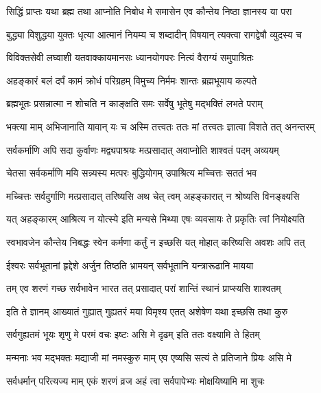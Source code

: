 \twolineshloka
{सिद्धिं प्राप्तः यथा ब्रह्म तथा आप्नोति निबोध मे}
{समासेन एव कौन्तेय निष्ठा ज्ञानस्य या परा}%

\twolineshloka
{बुद्ध्या विशुद्धया युक्तः धृत्या आत्मानं नियम्य च}
{शब्दादीन् विषयान् त्यक्त्वा रागद्वेषौ व्युदस्य च}%

\twolineshloka
{विविक्तसेवी लघ्वाशी यतवाक्कायमानसः}
{ध्यानयोगपरः नित्यं वैराग्यं समुपाश्रितः}%

\twolineshloka
{अहङ्कारं बलं दर्पं कामं क्रोधं परिग्रहम्}
{विमुच्य निर्ममः शान्तः ब्रह्मभूयाय कल्पते}%

\twolineshloka
{ब्रह्मभूतः प्रसन्नात्मा न शोचति न काङ्क्षति}
{समः सर्वेषु भूतेषु मद्भक्तिं लभते पराम्}%

\twolineshloka
{भक्त्या माम् अभिजानाति यावान् यः च अस्मि तत्त्वतः}
{ततः मां तत्त्वतः ज्ञात्वा विशते तत् अनन्तरम्}%

\twolineshloka
{सर्वकर्माणि अपि सदा कुर्वाणः मद्व्यपाश्रयः}
{मत्प्रसादात् अवाप्नोति शाश्वतं पदम् अव्ययम्}%

\twolineshloka
{चेतसा सर्वकर्माणि मयि सन्न्यस्य मत्परः}
{बुद्धियोगम् उपाश्रित्य मच्चित्तः सततं भव}%

\twolineshloka
{मच्चित्तः सर्वदुर्गाणि मत्प्रसादात् तरिष्यसि}
{अथ चेत् त्वम् अहङ्कारात् न श्रोष्यसि विनङ्क्ष्यसि}%

\twolineshloka
{यत् अहङ्कारम् आश्रित्य न योत्स्ये इति मन्यसे}
{मिथ्या एषः व्यवसायः ते प्रकृतिः त्वां नियोक्ष्यति}%

\twolineshloka
{स्वभावजेन कौन्तेय निबद्धः स्वेन कर्मणा}
{कर्तुं न इच्छसि यत् मोहात् करिष्यसि अवशः अपि तत्}%

\twolineshloka
{ईश्वरः सर्वभूतानां हृद्देशे अर्जुन तिष्ठति}
{भ्रामयन् सर्वभूतानि यन्त्रारूढानि मायया}%

\twolineshloka
{तम् एव शरणं गच्छ सर्वभावेन भारत}
{तत् प्रसादात् परां शान्तिं स्थानं प्राप्स्यसि शाश्वतम्}%

\twolineshloka
{इति ते ज्ञानम् आख्यातं गुह्यात् गुह्यतरं मया}
{विमृश्य एतत् अशेषेण यथा इच्छसि तथा कुरु}%

\twolineshloka
{सर्वगुह्यतमं भूयः शृणु मे परमं वचः}
{इष्टः असि मे दृढम् इति ततः वक्ष्यामि ते हितम्}%

\twolineshloka
{मन्मनाः भव मद्भक्तः मद्याजी मां नमस्कुरु}
{माम् एव एष्यसि सत्यं ते प्रतिजाने प्रियः असि मे}%

\twolineshloka
{सर्वधर्मान् परित्यज्य माम् एकं शरणं व्रज}
{अहं त्वा सर्वपापेभ्यः मोक्षयिष्यामि मा शुचः}%

